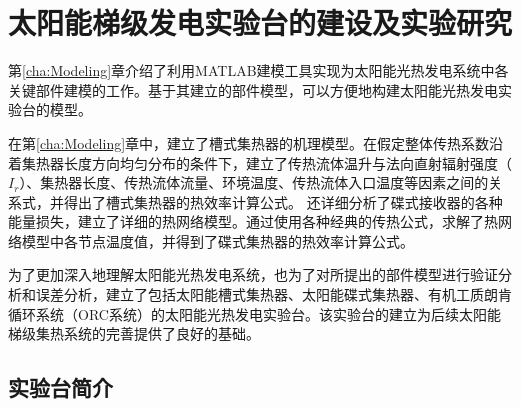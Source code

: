 \chapter{太阳能梯级发电实验台的建设及实验研究}

第\ref{cha:Modeling}章介绍了利用MATLAB建模工具实现为太阳能光热发电系统中各关键部件建模的工作。基于其建立的部件模型，可以方便地构建太阳能光热发电实验台的模型。

在第\ref{cha:Modeling}章中，建立了槽式集热器的机理模型。在假定整体传热系数沿着集热器长度方向均匀分布的条件下，建立了传热流体温升与法向直射辐射强度（$I_r$）、集热器长度、传热流体流量、环境温度、传热流体入口温度等因素之间的关系式，并得出了槽式集热器的热效率计算公式。
还详细分析了碟式接收器的各种能量损失，建立了详细的热网络模型。通过使用各种经典的传热公式，求解了热网络模型中各节点温度值，并得到了碟式集热器的热效率计算公式。

为了更加深入地理解太阳能光热发电系统，也为了对所提出的部件模型进行验证分析和误差分析，建立了包括太阳能槽式集热器、太阳能碟式集热器、有机工质朗肯循环系统（ORC系统）的太阳能光热发电实验台。该实验台的建立为后续太阳能梯级集热系统的完善提供了良好的基础。

\section{实验台简介}

